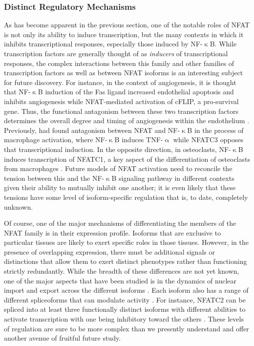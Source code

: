 \subsubsection{Distinct Regulatory Mechanisms}\label{nfatreg}

As has become apparent in the previous section, one of the notable roles of NFAT is not only its ability to induce transcription, but the many contexts in which it inhibits transcriptional responses, especially those induced by NF\hyp{}$\upkappa$B. While transcription factors are generally thought of as \textit{inducers} of transcriptional responses, the complex interactions between this family and other families of transcription factors as well as between NFAT isoforms is an interesting subject for future discovery. For instance, in the context of angiogenesis, it is thought that NF\hyp{}$\upkappa$B induction of the Fas ligand increased endothelial apoptosis and inhibits angiogenesis while NFAT\hyp{}mediated activation of cFLIP, a pro\hyp{}survival gene. Thus, the functional antagonism between these two transcription factors determines the overall degree and timing of angiogenesis within the endothelium \citep{Aurora2010}. Previously, \citet{Conboy1999} had found antagonism between NFAT and NF\hyp{}$\upkappa$B in the process of macrophage activation, where NF\hyp{}$\upkappa$B induces TNF\hyp{}$\upalpha$ while NFATC3 opposes that transcriptional induction. In the opposite direction, in osteoclasts, NF\hyp{}$\upkappa$B induces transcription of NFATC1, a key aspect of the differentiation of osteoclasts from macrophages \citep{Asagiri2005}. Future models of NFAT activation need to reconcile the tension between this and the NF\hyp{}$\upkappa$B signaling pathway in different contexts given their ability to mutually inhibit one another; it is even likely that these tensions have some level of isoform\hyp{}specific regulation that is, to date, completely unknown. 

Of course, one of the major mechanisms of differentiating the members of the NFAT family is in their expression profile. Isoforms that are exclusive to particular tissues are likely to exert specific roles in those tissues. However, in the presence of overlapping expression, there must be additional signals or distinctions that allow them to exert distinct phenotypes rather than functioning strictly redundantly. While the breadth of these differences are not yet known, one of the major aspects that have been studied is in the dynamics of nuclear import and export across the different isoforms \citep{Chow1997, Yissachar2013, Kar2015, Kar2016, Ulrich2012}. Each isoform also has a range of different spliceoforms that can modulate activity \citep{Vihma2008, Mancini2009}. For instance, NFATC2 can be spliced into at least three functionally distinct isoforms with different abilities to activate transcription with one being inhibitory toward the others \citep{Chuvpilo1999}. These levels of regulation are sure to be more complex than we presently understand and offer another avenue of fruitful future study.


